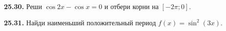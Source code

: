 \noindent\begin{minipage}[t]{\linewidth}\textbf{25.30.}\starmark{} Реши \(\cos2x-\cos x=0\) и отбери корни на \([-2\pi;0]\).\par\end{minipage}\par
\noindent\begin{minipage}[t]{\linewidth}\textbf{25.31.}\starmark{} Найди наименьший положительный период \(f(x)=\sin^2(3x)\).\par\end{minipage}\par
\endgroup
